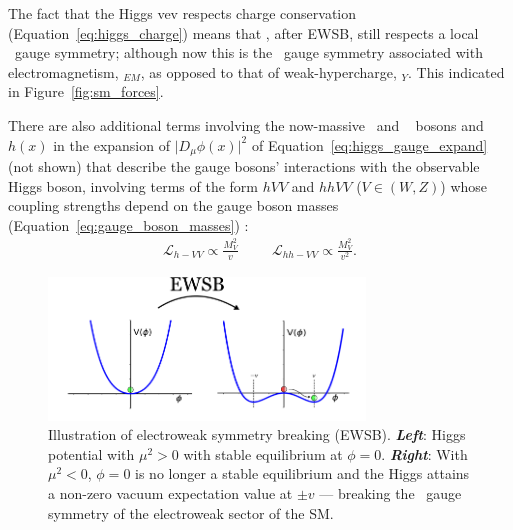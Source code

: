 The fact that the Higgs vev respects charge conservation (Equation~\ref{eq:higgs_charge}) means
that \SML, after EWSB, still respects a local \Uone~gauge symmetry; although now
this is the \Uone~gauge symmetry associated with electromagnetism, \Uone$_{EM}$,
as opposed to that of weak-hypercharge, \Uone$_Y$. This indicated in Figure~\ref{fig:sm_forces}.

There are also additional terms involving the now-massive \fieldWpm~and \fieldZ~ bosons and $h(x)$ in the expansion of $\lvert D_{\mu}\phi(x)\rvert^2$ of
Equation~\ref{eq:higgs_gauge_expand} (not shown) that describe the gauge bosons' interactions with the observable Higgs boson,
involving terms of the form $hVV$ and $hhVV$ ($V\in(W,Z)$) whose coupling strengths depend
on the gauge boson masses (Equation~\ref{eq:gauge_boson_masses}) {\color{red}{feynman diagrams?}}:
\begin{align}
	\mathcal{L}_{h-VV} \propto \frac{M_V^2}{v} \hspace{1cm} \mathcal{L}_{hh-VV} \propto \frac{M_V^2}{v^2}.
	\label{eq:higgs_gauge_couplings}
\end{align}
\begin{figure}[!htb]
	\begin{center}
		\includegraphics[width=0.75\textwidth]{figures/chapter1/higgs_potential_trans}
		\caption{Illustration of electroweak symmetry breaking (EWSB).
			\textbf{\textit{Left}}: Higgs potential with $\mu^2>0$ with stable equilibrium at $\phi=0$.
			\textbf{\textit{Right}}: With $\mu^2<0$, $\phi=0$ is no longer
			a stable equilibrium and the Higgs attains a non-zero vacuum
			expectation value at $\pm v$ --- breaking the \SUewk~gauge symmetry of the electroweak
			sector of the SM.
		}
	\label{fig:higgs_ewsb}
	\end{center}
\end{figure}


